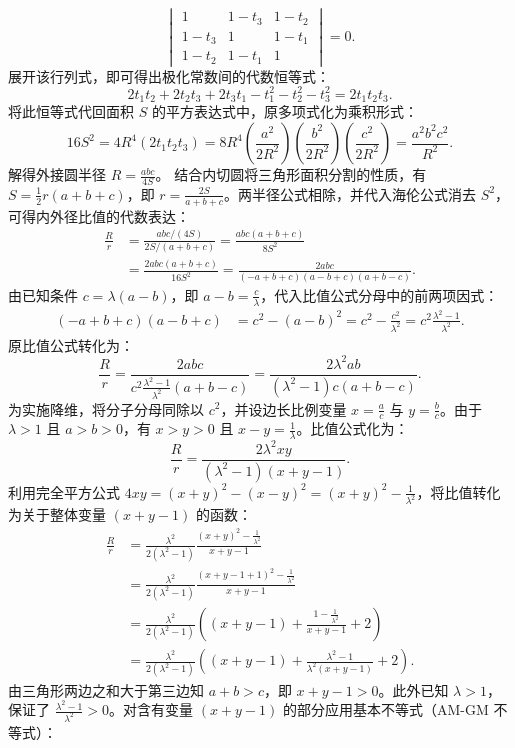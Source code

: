 \begin{solution}
\[\begin{vmatrix}
1 & 1-t_3 & 1-t_2 \\ 
1-t_3 & 1 & 1-t_1 \\ 
1-t_2 & 1-t_1 & 1 
\end{vmatrix} = 0.
\]
展开该行列式，即可得出极化常数间的代数恒等式：
\[
2t_1 t_2 + 2t_2 t_3 + 2t_3 t_1 - t_1^2 - t_2^2 - t_3^2 = 2t_1 t_2 t_3.
\]
将此恒等式代回面积 $S$ 的平方表达式中，原多项式化为乘积形式：
\[
16S^2 = 4R^4 (2t_1 t_2 t_3) = 8R^4 \left(\frac{a^2}{2R^2}\right)\left(\frac{b^2}{2R^2}\right)\left(\frac{c^2}{2R^2}\right) = \frac{a^2 b^2 c^2}{R^2}.
\]
解得外接圆半径 $R = \frac{abc}{4S}$。
结合内切圆将三角形面积分割的性质，有 $S = \frac{1}{2} r (a+b+c)$，即 $r = \frac{2S}{a+b+c}$。两半径公式相除，并代入海伦公式消去 $S^2$，可得内外径比值的代数表达：
\begin{align*}
\frac{R}{r} &= \frac{abc / (4S)}{2S / (a+b+c)} = \frac{abc(a+b+c)}{8S^2} \\
&= \frac{2abc(a+b+c)}{16S^2} = \frac{2abc}{(-a+b+c)(a-b+c)(a+b-c)}.
\end{align*}
由已知条件 $c = \lambda(a-b)$，即 $a-b = \frac{c}{\lambda}$，代入比值公式分母中的前两项因式：
\begin{align*}
(-a+b+c)(a-b+c) &= c^2 - (a-b)^2 = c^2 - \frac{c^2}{\lambda^2} = c^2 \frac{\lambda^2-1}{\lambda^2}.
\end{align*}
原比值公式转化为：
\[
\frac{R}{r} = \frac{2abc}{c^2 \frac{\lambda^2-1}{\lambda^2} (a+b-c)} = \frac{2\lambda^2 ab}{(\lambda^2-1)c(a+b-c)}.
\]
为实施降维，将分子分母同除以 $c^2$，并设边长比例变量 $x = \frac{a}{c}$ 与 $y = \frac{b}{c}$。由于 $\lambda > 1$ 且 $a > b > 0$，有 $x > y > 0$ 且 $x - y = \frac{1}{\lambda}$。比值公式化为：
\[
\frac{R}{r} = \frac{2\lambda^2 xy}{(\lambda^2-1)(x+y-1)}.
\]
利用完全平方公式 $4xy = (x+y)^2 - (x-y)^2 = (x+y)^2 - \frac{1}{\lambda^2}$，将比值转化为关于整体变量 $(x+y-1)$ 的函数：
\begin{align*}
\frac{R}{r} &= \frac{\lambda^2}{2(\lambda^2-1)} \frac{(x+y)^2 - \frac{1}{\lambda^2}}{x+y-1} \\
&= \frac{\lambda^2}{2(\lambda^2-1)} \frac{(x+y-1+1)^2 - \frac{1}{\lambda^2}}{x+y-1} \\
&= \frac{\lambda^2}{2(\lambda^2-1)} \left( (x+y-1) + \frac{1 - \frac{1}{\lambda^2}}{x+y-1} + 2 \right) \\
&= \frac{\lambda^2}{2(\lambda^2-1)} \left( (x+y-1) + \frac{\lambda^2-1}{\lambda^2(x+y-1)} + 2 \right).
\end{align*}
由三角形两边之和大于第三边知 $a+b > c$，即 $x+y-1 > 0$。此外已知 $\lambda > 1$，保证了 $\frac{\lambda^2-1}{\lambda^2} > 0$。对含有变量 $(x+y-1)$ 的部分应用基本不等式（AM-GM 不等式）：

\end{solution}
